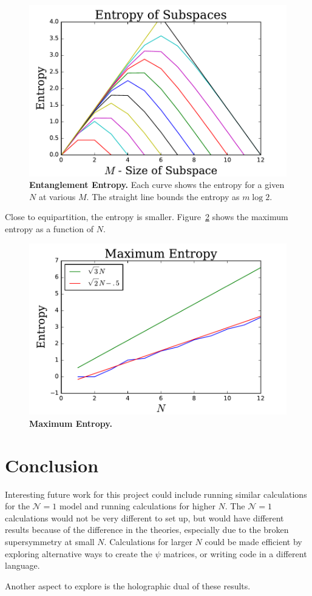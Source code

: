 \documentclass[12pt]{article} %
\renewcommand{\cal}{\mathcal}
\begin{document}
\begin{figure}
	\centering
	\includegraphics[width=.5\textwidth]{allentropy}
	\caption{\textbf{Entanglement Entropy.} Each curve shows the entropy for a given $N$ at various $M$. The straight line bounds the entropy as $m\log2$.}
	\label{fig:allentropy}
\end{figure}

Close to equipartition, the entropy is smaller. Figure~\ref{fig:maxentropy} shows the maximum entropy as a function of $N$.

\begin{figure}
	\centering
	\includegraphics[width=.5\textwidth]{maxentropy}
	\caption{\textbf{Maximum Entropy.} }
	\label{fig:maxentropy}
\end{figure}

\section{Conclusion}

Interesting future work for this project could include running similar calculations for the $\cal N=1$ model and running calculations for higher $N$. The $\cal N=1$ calculations would not be very different to set up, but would have different results because of the difference in the theories, especially due to the broken supersymmetry at small $N$. Calculations for larger $N$ could be made efficient by exploring alternative ways to create the $\psi$ matrices, or writing code in a different language.

Another aspect to explore is the holographic dual of these results.

\printbibliography
\end{document}
